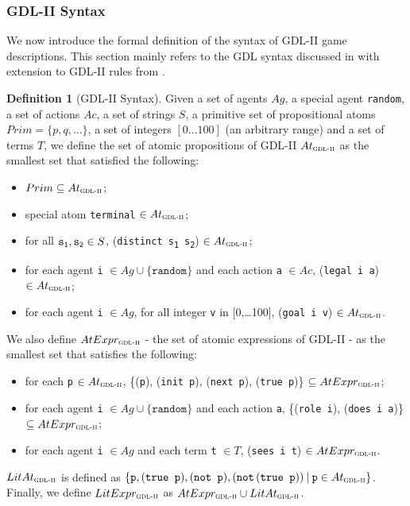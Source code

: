 \documentclass{article}
\theoremstyle{theorem}
\theoremstyle{lemma}
\theoremstyle{definition}
\newtheorem{definition}{Definition}[section]
\theoremstyle{remark}
\begin{document}
\subsubsection{GDL-II Syntax}
\par We now introduce the formal definition of the syntax of GDL-II game descriptions. This section mainly refers to the GDL syntax discussed in \citep{GDLpaper} with extension to GDL-II rules from \citep{gdlii}.
\begin{definition}[GDL-II Syntax]
    Given a set of agents $Ag$, a special agent \texttt{random}, a set of actions $Ac$, a set of strings $S$, a primitive set of
    propositional atoms $Prim=\{p,q, \ldots \}$, a set of integers $[0 \ldots 100]$ (an arbitrary range) and a set of terms $T$, we define the set of atomic propositions of GDL-II $At_\textsc{gdl-ii}$ as the smallest set that satisfied the following:
    \begin{itemize}
        \setlength\itemsep{0em}
        \item $Prim \subseteq At_\textsc{gdl-ii}$;
        \item special atom \texttt{terminal} $\in At_\textsc{gdl-ii}$;
        \item for all $\texttt{s\textsubscript{1}}, \texttt{s\textsubscript{2}} \in S$, (\texttt{distinct s\textsubscript{1} s\textsubscript{2}}) $\in At_\textsc{gdl-ii}$;
        \item for each agent \texttt{i} $\in Ag \cup \{\texttt{random} \}$ and each action \texttt{a} $\in Ac$, (\texttt{legal i a}) $\in At_\textsc{gdl-ii}$;
        \item for each agent \texttt{i} $\in Ag$, for all integer \texttt{v} in [0,\ldots100], (\texttt{goal i v}) $\in At_\textsc{gdl-ii}$.
    \end{itemize}
    
    We also define $AtExpr_\textsc{gdl-ii}$ - the set of atomic expressions of GDL-II - as the smallest set that satisfies the following:
    \begin{itemize}
        \setlength\itemsep{0em}
        \item for each \texttt{p} $\in At_\textsc{gdl-ii}$, \{(\texttt{p}), (\texttt{init p}), (\texttt{next p}), (\texttt{true p})\} $\subseteq AtExpr_\textsc{gdl-ii}$;
        \item for each agent \texttt{i} $\in Ag \cup \{\texttt{random} \}$ and each action \texttt{a}, \{(\texttt{role i}), (\texttt{does i a})\} $\subseteq AtExpr_\textsc{gdl-ii}$;
        \item for each agent \texttt{i} $\in Ag$ and each term \texttt{t} $\in T$, (\texttt{sees i t}) $\in AtExpr_\textsc{gdl-ii}$.
    \end{itemize}
    
    $LitAt_\textsc{gdl-ii}$ is defined as $\{\texttt{p}, (\texttt{true p}), (\texttt{not p}), (\texttt{not}\,(\texttt{true p}))\:|\: \texttt{p} \in At_\textsc{gdl-ii}\}$. Finally, we define $LitExpr_\textsc{gdl-ii}$ as $AtExpr_\textsc{gdl-ii} \cup LitAt_\textsc{gdl-ii}$.
\end{definition}
\end{document}
